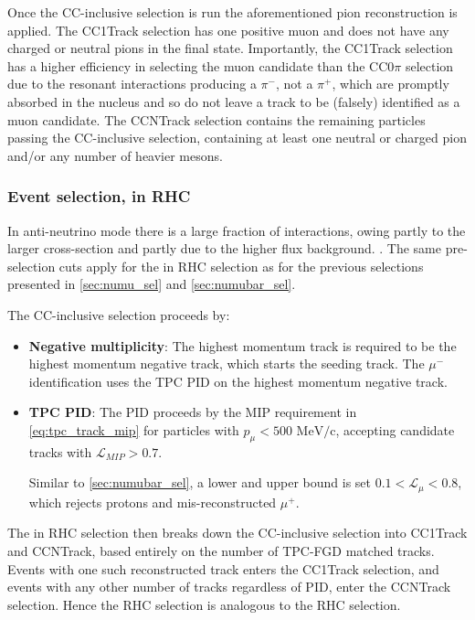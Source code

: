 Once the \numubar CC-inclusive selection is run the aforementioned pion reconstruction is applied. The \numubar CC1Track selection has one positive muon and does not have any charged or neutral pions in the final state. Importantly, the \numubar CC1Track selection has a higher efficiency in selecting the muon candidate than the \numu CC0$\pi$ selection due to the \numubar resonant interactions producing a $\pi^-$, not a $\pi^+$, which are promptly absorbed in the nucleus and so do not leave a track to be (falsely) identified as a muon candidate. The \numubar CCNTrack selection contains the remaining particles passing the \numubar CC-inclusive selection, containing at least one neutral or charged pion and/or any number of heavier mesons.

\subsubsection{Event selection, \numu in RHC}
\label{sec:numu_in_nubar_sel}
In anti-neutrino mode there is a large fraction of \numu interactions, owing partly to the larger \numu cross-section and partly due to the higher flux background. . The same pre-selection cuts apply for the \numu in RHC selection as for the previous selections presented in \autoref{sec:numu_sel} and \autoref{sec:numubar_sel}.

The CC-inclusive selection proceeds by:
\begin{itemize}
	\item \textbf{Negative multiplicity}: The highest momentum track is required to be the highest momentum negative track, which starts the seeding track. The $\mu^-$ identification uses the TPC PID on the highest momentum negative track. 
	
	\item \textbf{TPC PID}: The PID proceeds by the MIP requirement in \autoref{eq:tpc_track_mip} for particles with $p_\mu < 500 \text{ MeV/c}$, accepting candidate tracks with $\mathcal{L}_{MIP} > 0.7$.
	
	Similar to \autoref{sec:numubar_sel}, a lower and upper bound is set $0.1 < \mathcal{L}_\mu < 0.8$, which rejects protons and mis-reconstructed $\mu^+$.
\end{itemize}
The \numu in RHC selection then breaks down the CC-inclusive selection into CC1Track and CCNTrack, based entirely on the number of TPC-FGD matched tracks. Events with one such reconstructed track enters the CC1Track selection, and events with any other number of tracks regardless of PID, enter the CCNTrack selection. Hence the \numu RHC selection is analogous to the \numubar RHC selection.



